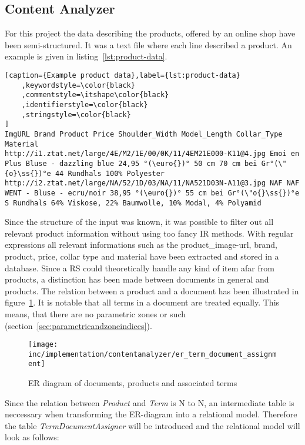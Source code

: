 
\subsection{Content Analyzer}
\label{sec:content-analyzer}
For this project the data describing the products, offered by an online shop have been semi-structured.
It was a text file where each line described a product.
An example is given in listing~\ref{lst:product-data}.

\begin{lstlisting}[caption={Example product data},label={lst:product-data}
    ,keywordstyle=\color{black}
    ,commentstyle=\itshape\color{black}
    ,identifierstyle=\color{black}
    ,stringstyle=\color{black}
]
ImgURL Brand Product Price Shoulder_Width Model_Length Collar_Type Material
http://i1.ztat.net/large/4E/M2/1E/00/0K/11/4EM21E000-K11@4.jpg Emoi en Plus Bluse - dazzling blue 24,95 °(\euro{})° 50 cm 70 cm bei Gr°(\"{o}\ss{})°e 44 Rundhals 100% Polyester
http://i2.ztat.net/large/NA/52/1D/03/NA/11/NA521D03N-A11@3.jpg NAF NAF WENT - Bluse - ecru/noir 38,95 °(\euro{})° 55 cm bei Gr°(\"o{}\ss{})°e S Rundhals 64% Viskose, 22% Baumwolle, 10% Modal, 4% Polyamid
\end{lstlisting}

\noindent
Since the structure of the input was known, it was possible to filter out all relevant product information without using too fancy IR methods.
With regular expressions all relevant informations such as the product\_image-url, brand, product, price, collar type and material have been extracted and stored in a database.
Since a RS could theoretically handle any kind of item afar from products, a distinction has been made between documents in general and products.
The relation between a product and a document has been illustrated in figure~\ref{fig:ertermdocumentassignment}.
It is notable that all terms in a document are treated equally.
This means, that there are no parametric zones or such (section~\ref{sec:parametricandzoneindices}).
\begin{figure}[h]
    \center
    \texttt{[image: inc/implementation/contentanalyzer/er\_term\_document\_assignment]}
    \caption{ER diagram of documents, products and associated terms}
    \label{fig:ertermdocumentassignment}
\end{figure}
Since the relation between \textit{Product} and \textit{Term} is N to N, an intermediate table is neccessary when transforming the ER-diagram into a relational model.
Therefore the table \textit{TermDocumentAssigner} will be introduced and the relational model will look as follows:


